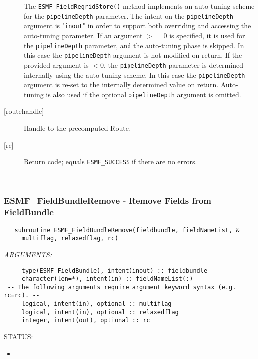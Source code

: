 \begin{description}
   The {\tt ESMF\_FieldRegridStore()} method implements an auto-tuning scheme
   for the {\tt pipelineDepth} parameter. The intent on the
   {\tt pipelineDepth} argument is "{\tt inout}" in order to
   support both overriding and accessing the auto-tuning parameter.
   If an argument $>= 0$ is specified, it is used for the
   {\tt pipelineDepth} parameter, and the auto-tuning phase is skipped.
   In this case the {\tt pipelineDepth} argument is not modified on
   return. If the provided argument is $< 0$, the {\tt pipelineDepth}
   parameter is determined internally using the auto-tuning scheme. In this
   case the {\tt pipelineDepth} argument is re-set to the internally
   determined value on return. Auto-tuning is also used if the optional
   {\tt pipelineDepth} argument is omitted.
  
   \item [{[routehandle]}]
   Handle to the precomputed Route.
   \item [{[rc]}]
   Return code; equals {\tt ESMF\_SUCCESS} if there are no errors.
   \end{description}
   
 
\mbox{}\hrulefill\ 
 
\subsubsection [ESMF\_FieldBundleRemove] {ESMF\_FieldBundleRemove - Remove Fields from FieldBundle}


  
\begin{verbatim}   subroutine ESMF_FieldBundleRemove(fieldbundle, fieldNameList, &
     multiflag, relaxedflag, rc)\end{verbatim}{\em ARGUMENTS:}
\begin{verbatim}     type(ESMF_FieldBundle), intent(inout) :: fieldbundle
     character(len=*), intent(in) :: fieldNameList(:)
 -- The following arguments require argument keyword syntax (e.g. rc=rc). --
     logical, intent(in), optional :: multiflag
     logical, intent(in), optional :: relaxedflag
     integer, intent(out), optional :: rc\end{verbatim}
{\sf STATUS:}
   \begin{itemize}
   \item{}
   \end{itemize}
  
